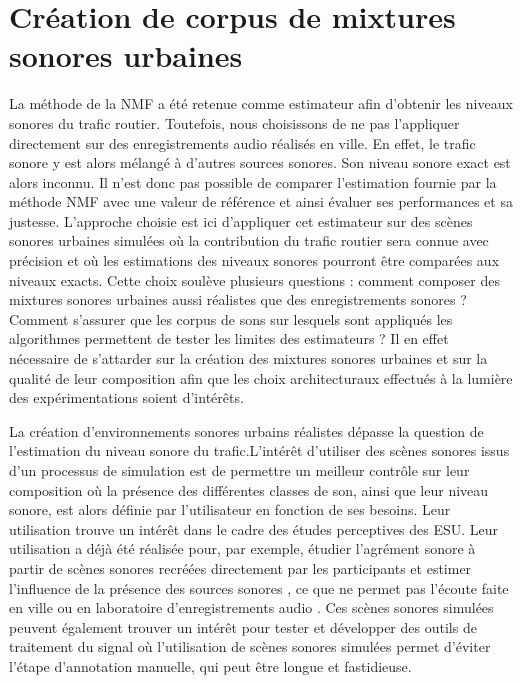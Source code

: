 %
%
%
%
%
%

\chapter{Création de corpus de mixtures sonores urbaines}
\label{chap:corpusSonore}

La méthode de la NMF a été retenue comme estimateur afin d'obtenir les niveaux sonores du trafic routier. Toutefois, nous choisissons de ne pas l'appliquer directement sur des enregistrements audio réalisés en ville. En effet, le trafic sonore y est alors mélangé à d'autres sources sonores. Son niveau sonore exact est alors inconnu. Il n'est donc pas possible de comparer l'estimation fournie par la méthode NMF avec une valeur de référence et ainsi évaluer ses performances et sa justesse. L'approche choisie est ici d'appliquer cet estimateur sur des scènes sonores urbaines simulées où la contribution du trafic routier sera connue avec précision et où les estimations des niveaux sonores pourront être comparées aux niveaux exacts. Cette choix soulève plusieurs questions : comment composer des mixtures sonores urbaines aussi réalistes que des enregistrements sonores ? Comment s'assurer que les corpus de sons sur lesquels sont appliqués les algorithmes permettent de tester les limites des estimateurs ?
Il en effet nécessaire de s'attarder sur la création des mixtures sonores urbaines et sur la qualité de leur composition afin que les choix architecturaux effectués à la lumière des expérimentations soient d'intérêts.

La création d'environnements sonores urbains réalistes dépasse la question de l'estimation du niveau sonore du trafic.L'intérêt d'utiliser des scènes sonores issus d'un processus de simulation est de permettre un meilleur contrôle sur leur composition où la présence des différentes classes de son, ainsi que leur niveau sonore, est alors définie par l'utilisateur en fonction de ses besoins.
Leur utilisation trouve un intérêt dans le cadre des études perceptives des ESU. Leur utilisation a déjà été réalisée pour, par exemple, étudier l'agrément sonore à partir de scènes sonores recréées directement par les participants et estimer l'influence de la présence des sources sonores \cite{lafay_new_2014}, ce que ne permet pas l'écoute faite en ville \cite{adams_soundwalking_2008, liu2014effects} ou en laboratoire d'enregistrements audio \cite{guastavino2005ecological, cain2013development}.
Ces scènes sonores simulées peuvent également trouver un intérêt pour tester et développer des outils de traitement du signal \cite{Komatsu2016, geiger2015improving} où l'utilisation de scènes sonores simulées permet d'éviter l'étape d'annotation manuelle, qui peut être longue et fastidieuse.

